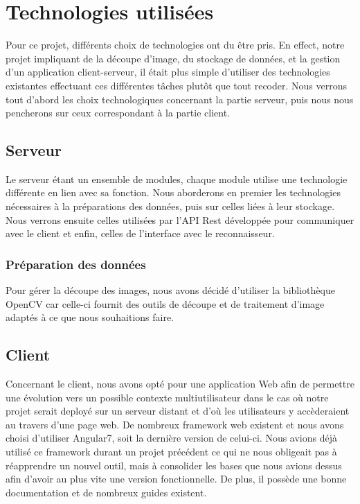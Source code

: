 \chapter{Technologies utilisées}

Pour ce projet, différents choix de technologies ont du être pris. En effect, notre projet impliquant de la découpe d'image, du stockage de données, et la gestion d'un application client-serveur, il était plus simple d'utiliser des technologies existantes effectuant ces différentes tâches plutôt que tout recoder.
Nous verrons tout d'abord les choix technologiques concernant la partie serveur, puis nous nous pencherons sur ceux correspondant à la partie client.

\section{Serveur}

Le serveur étant un ensemble de modules, chaque module utilise une technologie différente en lien avec sa fonction. Nous aborderons en premier les technologies nécessaires à la préparations des données, puis sur celles liées à leur stockage. Nous verrons ensuite celles utilisées par l'API Rest développée pour communiquer avec le client et enfin, celles de l'interface avec le reconnaisseur.

\subsection{Préparation des données}

Pour gérer la découpe des images, nous avons décidé d'utiliser la bibliothèque OpenCV car celle-ci fournit des outils de découpe et de traitement d'image adaptés à ce que nous souhaitions faire.

\section{Client}

Concernant le client, nous avons opté pour une application Web afin de permettre une évolution vers un possible contexte multiutilisateur dans le cas où notre projet serait deployé sur un serveur distant et d'où les utilisateurs y accèderaient au travers d'une page web. De nombreux framework web existent et nous avons choisi d'utiliser Angular7, soit la dernière version de celui-ci. Nous avions déjà utilisé ce framework durant un projet précédent ce qui ne nous obligeait pas à réapprendre un nouvel outil, mais à consolider les bases que nous avions dessus afin d'avoir au plus vite une version fonctionnelle. De plus, il possède une bonne documentation et de nombreux guides existent.